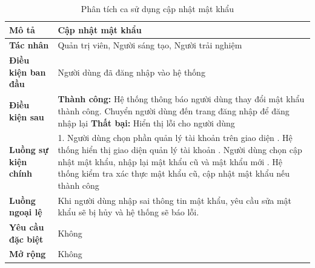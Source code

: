 \begin{table}
\centering
\caption{Phân tích ca sử dụng cập nhật mật khẩu}
\begin{tabular}{|p{4cm}|p{10cm}|}
    \hline
\textbf{Mô tả} & Cập nhật mật khẩu \\ \hline
\textbf{Tác nhân} & Quản trị viên, Người sáng tạo, Người trải nghiệm \\ \hline
\textbf{Điều kiện ban đầu} & Người dùng đã đăng nhập vào hệ thống \\ \hline
\textbf{Điều kiện sau} & 
\textbf{Thành công:} Hệ thống thông báo người dùng thay đổi mật khẩu thành công. Chuyển người dùng đến trang đăng nhập để đăng nhập lại \newline
\textbf{Thất bại:} Hiển thị lỗi cho người dùng \\ \hline
\textbf{Luồng sự kiện chính} & 
1. Người dùng chọn phần quản lý
tài khoản trên giao diện \newline
2. Hệ thống hiển thị giao diện quản
lý tài khoản \newline
3. Người dùng chọn cập nhật mật
khẩu, nhập lại mật khẩu cũ và mật
khẩu mới \newline
4. Hệ thống kiểm tra xác thực mật
khẩu cũ, cập nhật mật khẩu nếu
thành công \\ \hline
\textbf{Luồng ngoại lệ} & Khi người dùng nhập sai thông tin mật khẩu, yêu cầu sửa mật khẩu sẽ bị hủy và hệ thống sẽ báo lỗi. \\ \hline
\textbf{Yêu cầu đặc biệt} & Không \\ \hline
\textbf{Mở rộng} & Không \\ \hline
\end{tabular}
\end{table}

